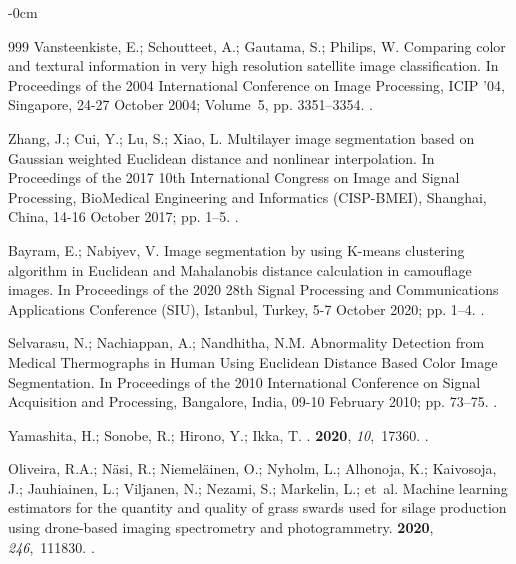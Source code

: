 \documentclass[analytics,article,accept,pdftex,moreauthors]{Definitions/mdpi}
\begin{document}
\begin{adjustwidth}{-\extralength}{0cm}
\begin{thebibliography}{999}
Vansteenkiste, E.; Schoutteet, A.; Gautama, S.; Philips, W.
\newblock Comparing color and textural information in very high resolution
  satellite image classification.
\newblock In Proceedings of the 2004 International Conference on Image
  Processing, ICIP '04, Singapore, 24-27 October 2004; Volume~5, pp. 3351--3354.
.
  
\newpage  
{}
Zhang, J.; Cui, Y.; Lu, S.; Xiao, L.
\newblock Multilayer image segmentation based on Gaussian weighted Euclidean
  distance and nonlinear interpolation.
\newblock In Proceedings of the 2017 10th International Congress on Image and
  Signal Processing, BioMedical Engineering and Informatics (CISP-BMEI), Shanghai, China, 14-16 October 2017;
  pp. 1--5.
.

Bayram, E.; Nabiyev, V.
\newblock Image segmentation by using K-means clustering algorithm in Euclidean
  and Mahalanobis distance calculation in camouflage images.
\newblock In Proceedings of the 2020 28th Signal Processing and Communications
  Applications Conference (SIU), Istanbul, Turkey, 5-7 October 2020; pp. 1--4.
.

Selvarasu, N.; Nachiappan, A.; Nandhitha, N.M.
\newblock Abnormality Detection from Medical Thermographs in Human Using
  Euclidean Distance Based Color Image Segmentation.
\newblock In Proceedings of the 2010 International Conference on Signal
  Acquisition and Processing, Bangalore, India,  09-10 February 2010; pp. 73--75.
.

Yamashita, H.; Sonobe, R.; Hirono, Y.; Ikka, T.
.
 {\bf 2020}, {\em 10},~17360.
.

Oliveira, R.A.; Näsi, R.; Niemeläinen, O.; Nyholm, L.; Alhonoja, K.;
  Kaivosoja, J.; Jauhiainen, L.; Viljanen, N.; Nezami, S.; Markelin, L.;
  et~al.
\newblock Machine learning estimators for the quantity and quality of grass
  swards used for silage production using drone-based imaging spectrometry and
  photogrammetry.
 {\bf 2020}, {\em 246},~111830.
.


\end{thebibliography}
\end{adjustwidth}
\end{document}
